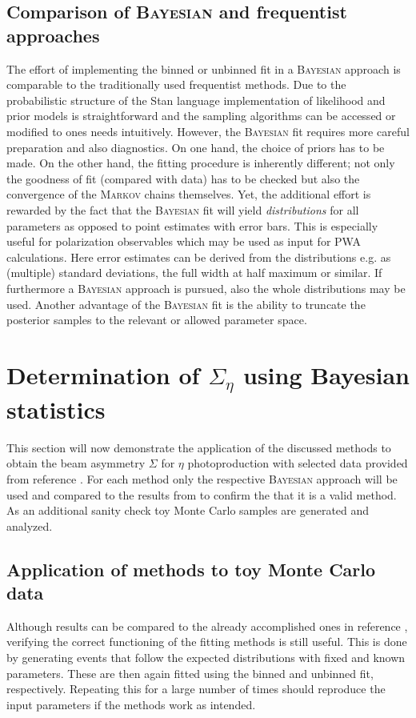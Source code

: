 \subsection{Comparison of \textsc{Bayesian} and frequentist approaches}
\label{sec:sigma_eta}
The effort of implementing the binned or unbinned fit in a \textsc{Bayesian} approach is comparable to the traditionally used frequentist methods. Due to the probabilistic structure of the Stan language \cite{stan} implementation of likelihood and prior models is straightforward and the sampling algorithms can be accessed or modified to ones needs intuitively. However, the \textsc{Bayesian} fit requires more careful preparation and also diagnostics. On one hand, the choice of priors has to be made. On the other hand, the fitting procedure is inherently different; not only the goodness of fit (compared with data) has to be checked but also the convergence of the \textsc{Markov} chains themselves. Yet, the additional effort is rewarded by the fact that the \textsc{Bayesian} fit will yield \emph{distributions} for all parameters as opposed to point estimates with error bars. This is especially useful for polarization observables which may be used as input for PWA calculations. Here error estimates can be derived from the distributions e.g. as (multiple) standard deviations, the full width at half maximum or similar. If furthermore a \textsc{Bayesian} approach is  pursued, also the whole distributions may be used. Another advantage of the \textsc{Bayesian} fit is the ability to truncate the posterior samples to the relevant or allowed parameter space.      

\section{Determination of $\Sigma_{\eta}$ using Bayesian statistics}
This section will now demonstrate the application of the discussed methods to obtain the beam asymmetry $\Sigma$ for $\eta$ photoproduction with selected data provided from reference \cite{farahphd}. For each method only the respective \textsc{Bayesian} approach will be used and compared to the results from \cite{farahphd} to confirm the that it is a valid method. As an additional sanity check toy Monte Carlo samples are generated and analyzed. 
\subsection{Application of methods to toy Monte Carlo data}
Although results can be compared to the already accomplished ones in reference \cite{farahphd}, verifying the correct functioning of the fitting methods is still useful. This is done by generating events that follow the expected distributions with fixed and known parameters. These are then again fitted using the binned and unbinned fit, respectively. Repeating this for a large number of times should reproduce the input parameters if the methods work as intended.

